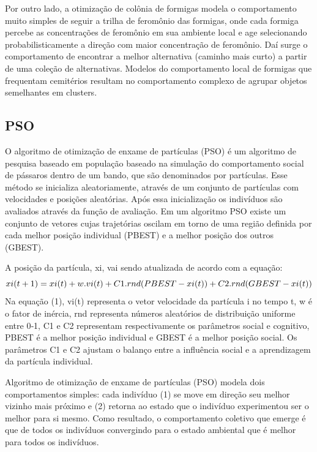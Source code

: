 \documentclass[10pt]{article}
\begin{document}
Por outro lado, a otimização de colônia de formigas modela o comportamento muito simples de seguir a trilha de feromônio das formigas, onde cada formiga percebe as concentrações de feromônio em sua
ambiente local e age selecionando probabilisticamente a direção com maior
concentração de feromônio. Daí surge o comportamento de encontrar a melhor alternativa (caminho mais curto) a partir de uma coleção de alternativas. Modelos do comportamento local de
formigas que frequentam cemitérios resultam no comportamento complexo de agrupar objetos semelhantes
em clusters.

\subsection{PSO}\label{sec:PSO}
O algoritmo de otimização de enxame de partículas (PSO) é um algoritmo de pesquisa baseado em população baseado na simulação do comportamento social de pássaros dentro de um bando, que são denominados por partículas. Esse método se inicializa aleatoriamente, através de um conjunto de partículas com velocidades e posições aleatórias. Após essa inicialização os indivíduos são avaliados através da função de avaliação. Em um algoritmo PSO existe um conjunto de vetores cujas trajetórias oscilam em torno de uma região definida por cada melhor posição individual (PBEST) e a melhor posição dos outros (GBEST).

A posição da partícula, xi, vai sendo atualizada de acordo com a equação:
\begin{equation}
  \vspace{1cm}
    xi (t+1) = xi (t) + w.vi(t) + C1.rnd(PBEST ‐ xi (t)) + C2.rnd(GBEST ‐ xi (t))
\end{equation}
Na equação (1), vi(t) representa o vetor velocidade da partícula i no tempo t, w é o fator de inércia, rnd representa números aleatórios de distribuição uniforme entre 0‐1, C1 e C2 representam respectivamente os parâmetros social e cognitivo, PBEST é a melhor posição individual e GBEST é a melhor posição social. Os parâmetros C1 e C2 ajustam o balanço entre a influência social e a aprendizagem da partícula individual.

Algoritmo de otimização de enxame de partículas (PSO) modela dois comportamentos simples:  cada indivíduo (1) se move em direção seu melhor vizinho mais próximo e  (2) retorna ao estado que o indivíduo experimentou ser o melhor para si mesmo. Como resultado, o comportamento coletivo que emerge é que
de todos os indivíduos convergindo para o estado ambiental que é melhor para todos os indivíduos.
\end{document}
